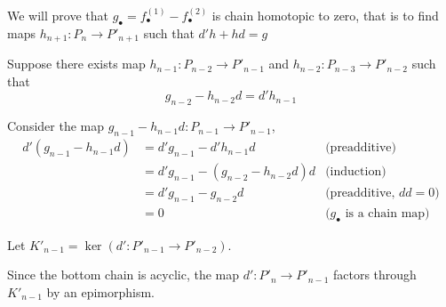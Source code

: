 \begin{longproof}
\begin{enumerate}
		We will prove that $g_\bullet = f^{(1)}_\bullet - f^{(2)}_\bullet$ is chain homotopic to zero, that is to find maps $h_{n+1}: P_n \to P'_{n+1}$ such that $d'h + hd = g$
		
		\begin{center}
		\end{center}
		
		Suppose there exists map $h_{n-1}: P_{n-2} \to P'_{n-1}$ and $h_{n-2}: P_{n-3} \to P'_{n-2}$ such that
		$$
		g_{n-2} - h_{n-2} d = d' h_{n-1}
		$$
		
		\begin{center}
		\end{center}
		
		Consider the map $g_{n-1} - h_{n-1} d: P_{n-1} \to P'_{n-1}$,
		\begin{align*}
			d'(g_{n-1} - h_{n-1} d) 
			&= d' g_{n-1} - d' h_{n-1} d &\text{(preadditive)}\\
			&= d' g_{n-1} - (g_{n-2} - h_{n-2} d) d &\text{(induction)}\\
			&= d' g_{n-1} - g_{n-2} d &\text{(preadditive, $dd=0$)}\\
			&= 0 &\text{($g_\bullet$ is a chain map)}
		\end{align*}
		
		Let $K'_{n-1} = \ker(d': P'_{n-1} \to P'_{n-2})$.
		
		Since the bottom chain is acyclic, the map $d': P'_n \to P'_{n-1}$ factors through $K'_{n-1}$ by an epimorphism.
		

\end{enumerate}
\end{longproof}
